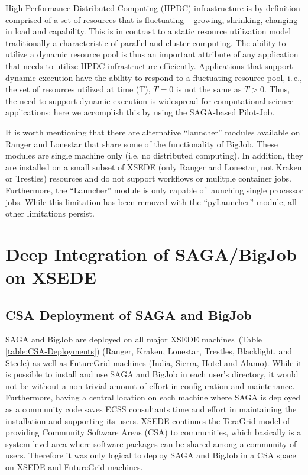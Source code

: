 \documentclass{sig-alternate}
\begin{document}
High Performance Distributed Computing (HPDC) infrastructure is by definition
comprised of a set of resources that is fluctuating -- growing, shrinking,
changing in load and capability. This is in contrast to a static resource
utilization model traditionally a characteristic of parallel and cluster
computing. The ability to utilize a dynamic resource pool is thus an important
attribute of any application that needs to utilize HPDC infrastructure
efficiently. Applications that support dynamic execution have the
ability to respond to a fluctuating resource pool, i.\,e., the set of
resources utilized at time (T), $T=0$ is not the same as $T>0$.  Thus,
the need to support dynamic execution is widespread for computational
science applications; here we accomplish this by using the SAGA-based
Pilot-Job.

It is worth mentioning that there are alternative ``launcher'' modules
available on Ranger and Lonestar that share some of the functionality
of BigJob. These modules are single machine only (i.e. no distributed
computing). In addition, they are installed on a small subset of XSEDE (only Ranger and Lonestar,
not Kraken or Trestles) resources and do not support workflows or mulitple container
jobs. Furthermore, the ``Launcher'' module is only capable of launching
single processor jobs. While this limitation has been removed with the ``pyLauncher''
module, all other limitations persist.

\section{Deep Integration of SAGA/BigJob on XSEDE}

\subsection{CSA Deployment of SAGA and BigJob}
 \label{ssec:csa}
 
SAGA and BigJob are deployed on all major XSEDE
machines~(Table \ref{table:CSA-Deployments}) (Ranger,
Kraken, Lonestar, Trestles, Blacklight, and Steele) as well as FutureGrid machines
(India, Sierra, Hotel and Alamo). While it is possible to install and
use SAGA and BigJob in each user's directory, it would not be without a non-trivial amount of effort in configuration and maintenance. Furthermore, having a
central location on each machine where SAGA is deployed as a community code
saves ECSS consultants time and effort in maintaining the installation and
supporting its users. XSEDE continues the TeraGrid model of providing Community
Software Areas (CSA) to communities, which basically is a system
level area where software packages can be shared among a community of users.
Therefore it was only logical to deploy SAGA and BigJob in a CSA space on XSEDE
and FutureGrid machines.
\end{document}
